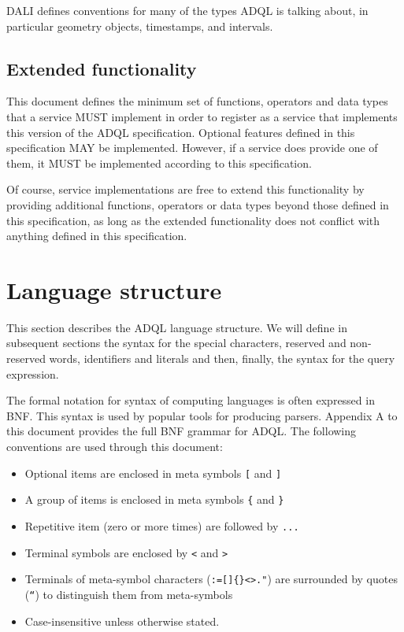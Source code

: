 \documentclass[11pt,a4paper]{ivoa}
\begin{document}
DALI \citep{2017ivoa.spec.0517D} defines conventions for many of the
types ADQL is talking about, in particular geometry objects, timestamps,
and intervals.

\subsection{Extended functionality}
\label{sec:extending}

This document defines the minimum set of functions, operators and data types
that a service MUST implement in order to register as a service that
implements this version of the ADQL specification. Optional features defined in
this specification MAY be implemented. However, if a service does provide one of
them, it MUST be implemented according to this specification.

Of course, service implementations are free to extend this functionality by
providing additional functions, operators or data types beyond those defined in
this specification, as long as the extended functionality does not conflict
with anything defined in this specification.

\clearpage %
\section{Language structure}
\label{sec:language}

This section describes the ADQL language structure. We will define in
subsequent sections the syntax for the special characters, reserved and non-
reserved words, identifiers and literals and then, finally, the syntax for
the query expression.

The formal notation for syntax of computing languages is often expressed
in BNF. This syntax is used by popular tools for
producing parsers. Appendix A to this document provides the full BNF grammar
for ADQL. The following conventions are used through this document:

\begin{itemize}
    \item Optional items are enclosed in meta symbols \verb:[: and \verb:]:
    \item A group of items is enclosed in meta symbols \verb:{: and \verb:}:
    \item Repetitive item (zero or more times) are followed by \verb:...:
    \item Terminal symbols are enclosed by \verb:<: and \verb:>:
    \item Terminals of meta-symbol characters (\verb!:=[]{}<>."!) are surrounded by quotes (\verb:“:) to distinguish them from meta-symbols
    \item Case-insensitive unless otherwise stated.
\end{itemize}
\end{document}
